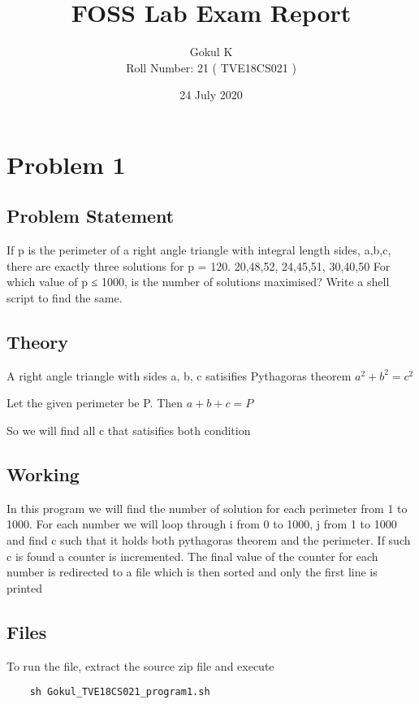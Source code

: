 \documentclass{article}
\begin{document}
\title{FOSS Lab Exam Report}
\author{Gokul K\\[2\baselineskip]
Roll Number: 21 ( TVE18CS021 )\\[2\baselineskip]}
\date{24 July 2020}

\maketitle
\newpage
\section{Problem 1}
\subsection{Problem Statement}
If p is the perimeter of a right angle triangle with integral length sides, {a,b,c}, there are exactly three solutions for p = 120.  {20,48,52}, {24,45,51}, {30,40,50} 
For which value of p ≤ 1000, is the number of solutions maximised? Write a shell script   to find the same.

\subsection{Theory}
A right angle triangle with sides a, b, c satisifies Pythagoras theorem
\(a^2 + b^2 = c^2\)

Let the given perimeter be P. Then
\(a + b + c = P\)


So we will find all c that satisifies both condition

\subsection{Working}
In this program we will find the number of solution for each perimeter from 1 to 1000. For each number we will loop through i from 0 to 1000, j from 1 to 1000 and find c such that it holds both pythagoras theorem and the perimeter.
If such c is found a counter is incremented. The final value of the counter for each number is redirected to a file which is then sorted and only the first line is printed

\subsection{Files}
To run the file, extract the source zip file
and execute
\begin{verbatim}
    sh Gokul_TVE18CS021_program1.sh
\end{verbatim}
\end{document}
